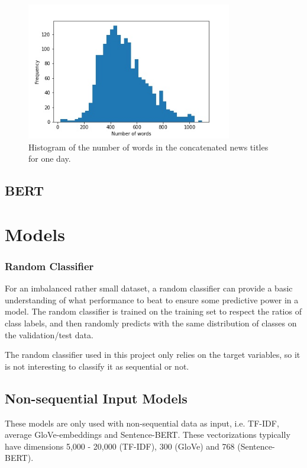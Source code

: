 \begin{figure}[h]
\centering
\includegraphics[width=0.8\textwidth]{Figures/wordcount.jpg}
\caption{Histogram of the number of words in the concatenated news titles for one day. }
\label{fig:num_words}
\end{figure}

\subsection{BERT}





\section{Models}

\subsubsection*{Random Classifier}

For an imbalanced rather small dataset, a random classifier can provide a basic understanding of what performance to beat to ensure some predictive power in a model. The random classifier is trained on the training set to respect the ratios of class labels, and then randomly predicts with the same distribution of classes on the validation/test data. 

The random classifier used in this project only relies on the target variables, so it is not interesting to classify it as sequential or not.  

\subsection{Non-sequential Input Models}

These models are only used with non-sequential data as input, i.e. TF-IDF, average GloVe-embeddings and Sentence-BERT. These vectorizations typically have dimensions 5,000 - 20,000 (TF-IDF), 300 (GloVe) and 768 (Sentence-BERT). 

